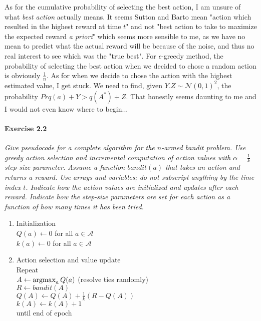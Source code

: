 As for the cumulative probability of selecting the best action, I am unsure of what \textit{best action} actually means.
It seems Sutton and Barto mean "action which resulted in the highest reward at time $t$" and not "best action to take to maximize the expected reward \textit{a priori}" which seems more sensible to me, as we have no mean to predict what the actual reward will be because of the noise, and thus no real interest to see which was the "true best".
For $\epsilon$-greedy method, the probability of selecting the best action when we decided to chose a random action is obviously $\frac{1}{n}$.
As for when we decide to chose the action with the highest estimated value, I get stuck.
We need to find, given $Y.Z \sim \mathcal{N}(0,1)^2$, the probability $Pr{q(a) + Y > q(A^*) + Z}$.
That honestly seems daunting to me and I would not even know where to begin...

\paragraph{Exercise 2.2}
\textit{Give pseudocode for a complete algorithm for the $n$-armed bandit problem. Use greedy action selection and incremental computation of action values with $\alpha = \frac{1}{k}$ step-size parameter. Assume a function $\mathit{bandit}(a)$ that takes an action and returns a reward. Use arrays and variables; do not subscript anything by the time index $t$. Indicate how the action values are initialized and updates after each reward. Indicate how the step-size parameters are set for each action as a function of how many times it has been tried.}

\begin{enumerate}
\item Initialization \\
$Q(a) \leftarrow 0$ for all $a \in \mathcal{A}$ \\
$k(a) \leftarrow 0$ for all $a \in \mathcal{A}$

\item Action selection and value update \\
Repeat \\
\-\hspace{2em} $A \leftarrow \operatorname*{argmax}_a Q(a)$ (resolve ties randomly) \\
\-\hspace{2em} $R \leftarrow \mathit{bandit}(A)$ \\
\-\hspace{2em} $Q(A) \leftarrow Q(A) + \frac{1}{k} (R - Q(A))$ \\
\-\hspace{2em} $k(A) \leftarrow k(A) + 1$ \\
until end of epoch
\end{enumerate}

